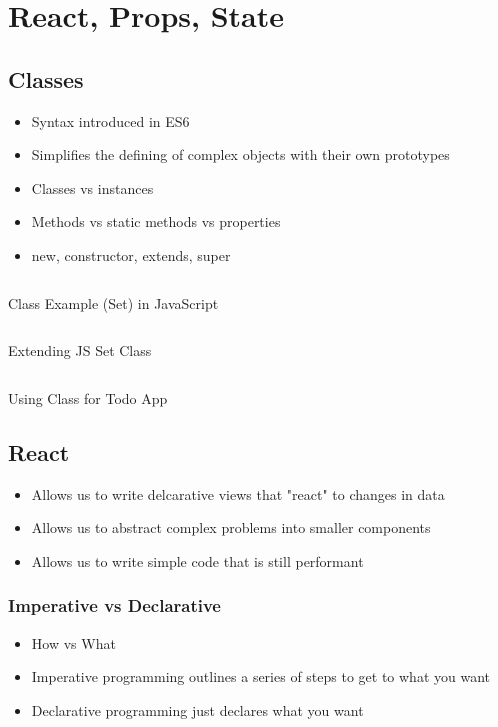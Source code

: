 \chapter{React, Props, State}
\section{Classes}
\begin{itemize}
	\item Syntax introduced in ES6
	\item Simplifies the defining of complex objects with their own prototypes
	\item Classes vs instances
	\item Methods vs static methods vs properties
	\item new, constructor, extends, super
\end{itemize}

\begin{code}
	\inputminted{js}{src2/1-Set.js}
	\caption{Class Example (Set) in JavaScript}
\end{code}

\begin{code}
	\inputminted{js}{src2/2-Set.js}
	\caption{Extending JS Set Class}
\end{code}

\clearpage
\begin{code}
	\inputminted{js}{src2/3-Todo.js}
	\caption{Using Class for Todo App}
\end{code}

\section{React}
\begin{itemize}
	\item Allows us to write delcarative views that "react" to changes in data
	\item Allows us to abstract complex problems into smaller components
	\item Allows us to write simple code that is still performant
\end{itemize}

\subsection{Imperative vs Declarative}
\begin{itemize}
	\item How vs What
	\item Imperative programming outlines a series of steps to get to what you want
	\item Declarative programming just declares what you want
\end{itemize}

